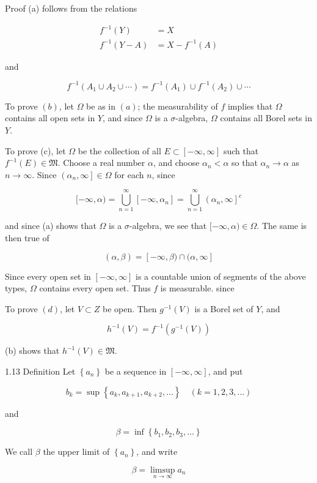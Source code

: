 \documentclass[10pt]{article}
\begin{document}
Proof (a) follows from the relations

$$
\begin{aligned}
f^{-1}(Y) & =X \\
f^{-1}(Y-A) & =X-f^{-1}(A)
\end{aligned}
$$

and

$$
f^{-1}\left(A_{1} \cup A_{2} \cup \cdots\right)=f^{-1}\left(A_{1}\right) \cup f^{-1}\left(A_{2}\right) \cup \cdots
$$

To prove $(b)$, let $\Omega$ be as in $(a)$; the measurability of $f$ implies that $\Omega$ contains all open sets in $Y$, and since $\Omega$ is a $\sigma$-algebra, $\Omega$ contains all Borel sets in $Y$.

To prove (c), let $\Omega$ be the collection of all $E \subset[-\infty, \infty]$ such that $f^{-1}(E) \in \mathfrak{M}$. Choose a real number $\alpha$, and choose $\alpha_{n}<\alpha$ so that $\alpha_{n} \rightarrow \alpha$ as $n \rightarrow \infty$. Since $\left(\alpha_{n}, \infty\right] \in \Omega$ for each $n$, since

$$
[-\infty, \alpha)=\bigcup_{n=1}^{\infty}\left[-\infty, \alpha_{n}\right]=\bigcup_{n=1}^{\infty}\left(\alpha_{n}, \infty\right]^{c}
$$

and since (a) shows that $\Omega$ is a $\sigma$-algebra, we see that $[-\infty, \alpha) \in \Omega$. The same is then true of

$$
(\alpha, \beta)=[-\infty, \beta) \cap(\alpha, \infty]
$$

Since every open set in $[-\infty, \infty]$ is a countable union of segments of the above types, $\Omega$ contains every open set. Thus $f$ is measurable. since

To prove $(d)$, let $V \subset Z$ be open. Then $g^{-1}(V)$ is a Borel set of $Y$, and

$$
h^{-1}(V)=f^{-1}\left(g^{-1}(V)\right)
$$

(b) shows that $h^{-1}(V) \in \mathfrak{M}$.

1.13 Definition Let $\left\{a_{n}\right\}$ be a sequence in $[-\infty, \infty]$, and put

$$
b_{k}=\sup \left\{a_{k}, a_{k+1}, a_{k+2}, \ldots\right\} \quad(k=1,2,3, \ldots)
$$

and

$$
\beta=\inf \left\{b_{1}, b_{2}, b_{3}, \ldots\right\}
$$

We call $\beta$ the upper limit of $\left\{a_{n}\right\}$, and write

$$
\beta=\limsup _{n \rightarrow \infty} a_{n}
$$
\end{document}
